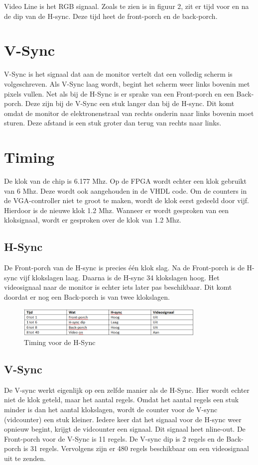 \documentclass[oneside,dutch]{tudelft-report}
\begin{document}
Video Line is het RGB signaal. Zoals te zien is in figuur 2, zit er tijd voor en na de dip van de H-sync. Deze tijd heet de front-porch en de back-porch. 

\section{V-Sync}
V-Sync is het signaal dat aan de monitor vertelt dat een volledig scherm is volgeschreven. Als V-Sync laag wordt, begint het scherm weer links bovenin met pixels vullen. Net als bij de H-Sync is er sprake van een Front-porch en een Back-porch. Deze zijn bij de V-Sync een stuk langer dan bij de H-sync. Dit komt omdat de monitor de elektronenstraal van rechts onderin naar links bovenin moet sturen. Deze afstand is een stuk groter dan terug van rechts naar links. 

\section{Timing}
De klok van de chip is 6.177 Mhz. Op de FPGA wordt echter een klok gebruikt van 6 Mhz. Deze wordt ook aangehouden in de VHDL code. Om de counters in de VGA-controller niet te groot te maken, wordt de klok eerst gedeeld door vijf. Hierdoor is de nieuwe klok 1.2 Mhz. Wanneer er wordt gesproken van een kloksignaal, wordt er gesproken over de klok van 1.2 Mhz.

\subsection{H-Sync}
De Front-porch van de H-sync is precies één klok slag. Na de Front-porch is de H-sync vijf klokslagen laag. Daarna is de H-sync 34 klokslagen hoog. Het videosignaal naar de monitor is echter iets later pas beschikbaar. Dit komt doordat er nog een Back-porch is van twee klokslagen. 

\begin{figure}[H]
\center
\includegraphics[width=9cm]{tabel-VGA-1}
\caption{Timing voor de H-Sync}
\label{VGA}
\end{figure}

\subsection{V-Sync}
De V-sync werkt eigenlijk op een zelfde manier als de H-Sync. Hier wordt echter niet de klok geteld, maar het aantal regels. Omdat het aantal regels een stuk minder is dan het aantal klokslagen, wordt de counter voor de V-sync (vidcounter) een stuk kleiner. Iedere keer dat het signaal voor de H-sync weer opnieuw begint, krijgt de vidcounter een signaal. Dit signaal heet nline-out. De Front-porch voor de V-Sync is 11 regels. De V-sync dip is 2 regels en de Back-porch is 31 regels. Vervolgens zijn er 480 regels beschikbaar om een videosignaal uit te zenden.
\end{document}
